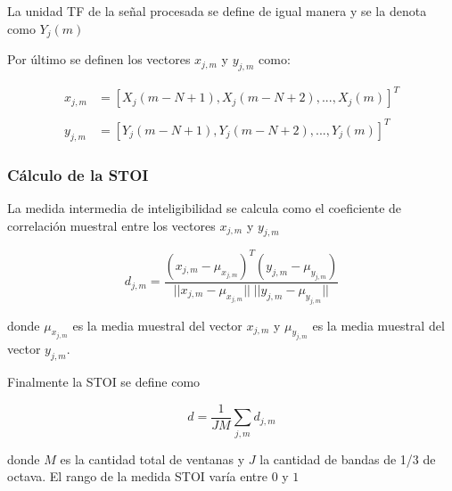 La unidad TF de la señal procesada se define de igual manera y se la denota como $Y_j(m)$

Por último se definen los vectores $x_{j,m}$ y $y_{j,m}$ como:

\begin{align*}
	x_{j,m} &= [X_j(m - N + 1), X_j(m - N + 2), ..., X_j(m)]^T \\ \\
	y_{j,m} &= [Y_j(m - N + 1), Y_j(m - N + 2), ..., Y_j(m)]^T
\end{align*}

\subsubsection{Cálculo de la STOI}

La medida intermedia de inteligibilidad se calcula como el coeficiente de correlación muestral entre los vectores $x_{j,m}$ y $y_{j,m}$

\begin{equation*}
	d_{j,m} = \frac{(x_{j,m} - \mu_{x_{j,m}})^T (y_{j,m} - \mu_{y_{j,m}})}{|| x_{j,m} - \mu_{x_{j,m}} || \; ||y_{j,m} - \mu_{y_{j,m}}||}
\end{equation*}

donde $\mu_{x_{j,m}}$ es la media muestral del vector $x_{j,m}$ y $\mu_{y_{j,m}}$ es la media muestral del vector $y_{j,m}$.

Finalmente la STOI se define como

\begin{equation*}
	d = \frac{1}{JM} \sum_{j,m} d_{j,m}
\end{equation*}

donde $M$ es la cantidad total de ventanas y $J$ la cantidad de bandas de 1/3 de octava. El rango de la medida STOI varía entre $0$ y $1$